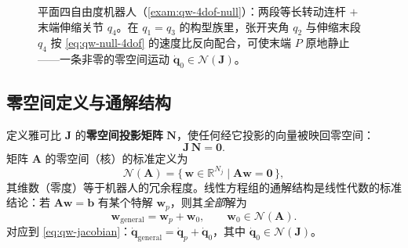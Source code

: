 \begin{figure}[ht]
\centering
{}
\caption{平面四自由度机器人（\cref{exam:qw-4dof-null}）：两段等长转动连杆 $+$ 末端伸缩关节 $q_4$。在 $q_1{=}q_3$ 的构型族里，张开夹角 $q_2$ 与伸缩末段 $q_4$ 按 \cref{eq:qw-null-4dof} 的速度比反向配合，可使末端 $P$ 原地静止——一条非零的零空间运动 $\dot{\boldsymbol{q}}_0\in\mathcal{N}(\boldsymbol{J})$。}
\label{fig:qw-4dof}
\end{figure}

\subsection{零空间定义与通解结构}
\label{subsec:qw-nullspace-def}

定义雅可比 $\boldsymbol{J}$ 的\textbf{零空间投影矩阵} $\boldsymbol{N}$，使任何经它投影的向量被映回零空间\cite{yu2021quadruped}：
\begin{equation}
  \boldsymbol{J}\,\boldsymbol{N}=\mathbf{0}.
  \label{eq:qw-JN-zero}
\end{equation}
矩阵 $\boldsymbol{A}$ 的零空间（核）的标准定义为
\begin{equation}
  \mathcal{N}(\boldsymbol{A})=\{\,\boldsymbol{w}\in\mathbb{R}^{N_j}\mid \boldsymbol{A}\boldsymbol{w}=\mathbf{0}\,\},
  \label{eq:qw-nullspace-set}
\end{equation}
其维数（零度）等于机器人的冗余程度。线性方程组的通解结构是线性代数的标准结论：若 $\boldsymbol{A}\boldsymbol{w}=\boldsymbol{b}$ 有某个特解 $\boldsymbol{w}_p$，则其\emph{全部}解为
\begin{equation}
  \boldsymbol{w}_{\mathrm{general}}=\boldsymbol{w}_p+\boldsymbol{w}_0,\qquad \boldsymbol{w}_0\in\mathcal{N}(\boldsymbol{A}).
  \label{eq:qw-general-sol}
\end{equation}
对应到 \cref{eq:qw-jacobian}：$\dot{\boldsymbol{q}}_{\mathrm{general}}=\dot{\boldsymbol{q}}_p+\dot{\boldsymbol{q}}_0$，其中 $\dot{\boldsymbol{q}}_0\in\mathcal{N}(\boldsymbol{J})$。

